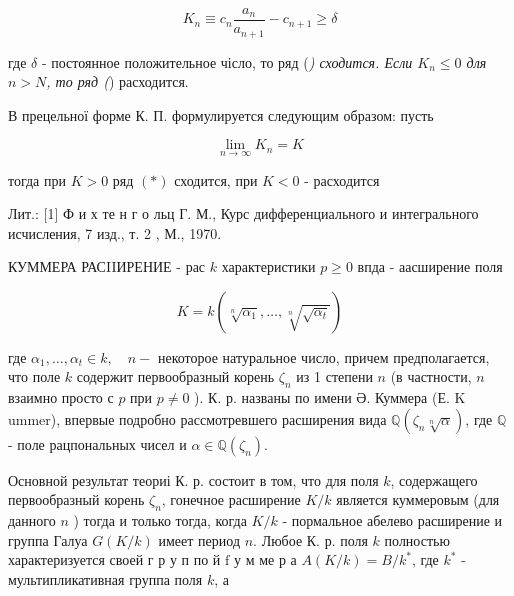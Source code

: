 \documentclass[10pt]{article}
\begin{document}
\[

K_{n} \equiv c_{n} \frac{a_{n}}{a_{n+1}}-c_{n+1} \geqslant \delta

\]



где $\delta$ - постоянное положительное чісло, то ряд (\textit{) сходится. Если $K_{n} \leqslant 0$ для $n>N$, то ряд (}) расходится.



В прецельної форме К. П. формулируется следующим образом: пусть



\[

\lim _{n \rightarrow \infty} K_{n}=K

\]



тогда при $K>0$ ряд $(*)$ сходится, при $K<0$ - расходится



Лит.: [1] Ф и х те н г о льц Г. М., Курс дифференциального и интегрального исчисления, 7 изд., т. 2 , М., 1970.



КУММЕРА РАСIIИРЕНИЕ - рас $k$ характеристики $p \geqslant 0$ впда - аасширение поля



\[

K=k\left(\sqrt[n]{\alpha_{1}}, \ldots, \sqrt[n]{\sqrt{\alpha_{t}}}\right)

\]



где $\alpha_{1}, \ldots, \alpha_{t} \in k, \quad n-$ некоторое натуральное число, причем предполагается, что поле $k$ содержит первообразный корень $\zeta_{n}$ из 1 степени $n$ (в частности, $n$ взаимно просто с $p$ при $p \neq 0$ ). К. р. названы по имени Ә. Куммера (Е. K ummer), впервые подробно рассмотревшего расширения вида $\mathbb{Q}\left(\zeta_{n} \sqrt[n]{\alpha}\right)$, где $\mathbb{Q}$ - поле рацпональных чисел и $\alpha \in \mathbb{Q}\left(\zeta_{n}\right)$.



Основной результат теориі К. р. состоит в том, что для поля $k$, содержащего первообразный корень $\zeta_{n}$, гонечное расширение $K / k$ является куммеровым (для данного $n$ ) тогда и только тогда, когда $K / k$ - пормальное абелево расширение и группа Галуа $G(K / k)$ имеет период $n$. Любое К. р. поля $k$ полностью характеризуется своей $г$ р у п по й $\mathrm{f}$ у м ме р а $A(K / k)=B / k^{*}$, где $k^{*}$ - мультипликативная группа поля $k$, а
\end{document}

